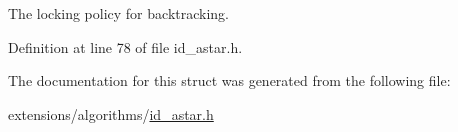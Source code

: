 The locking policy for backtracking. 

Definition at line 78 of file id\+\_\+astar.\+h.



The documentation for this struct was generated from the following file\+:\begin{DoxyCompactItemize}
\item 
extensions/algorithms/\hyperlink{id__astar_8h}{id\+\_\+astar.\+h}\end{DoxyCompactItemize}
